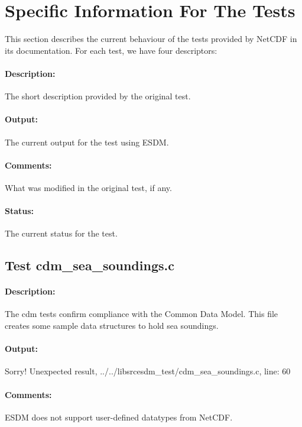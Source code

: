 \section{Specific Information For The Tests}
\label{sec:nctests}

This section describes the current behaviour of the tests provided by NetCDF in its documentation.
For each test, we have four descriptors:

\paragraph{Description:} The short description provided by the original test.

\paragraph{Output:} The current output for the test using ESDM.

\paragraph{Comments:} What was modified in the original test, if any.

\paragraph{Status:} The current status for the test.

\subsection{Test cdm\_sea\_soundings.c}

\paragraph{Description:} The cdm tests confirm compliance with the Common Data Model.
This file creates some sample data structures to hold sea soundings.

\paragraph{Output:} Sorry! Unexpected result, ../../libsrcesdm\_test/cdm\_sea\_soundings.c, line: 60

\paragraph{Comments:} ESDM does not support user-defined datatypes from NetCDF.

